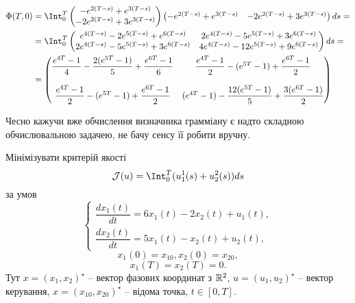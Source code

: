 \begin{solution}
    \begin{align*} 
        \Phi(T, 0) &= \Int_0^T \begin{pmatrix} -e^{2(T - s)} + e^{3(T - s)} \\ -2e^{2(T - s)} + 3e^{3(T - s)} \end{pmatrix} \begin{pmatrix} -e^{2(T - s)} + e^{3(T - s)} & -2e^{2(T - s)} + 3e^{3(T - s)} \end{pmatrix} ds = \\
        &= \Int_0^T \begin{pmatrix} e^{4(T - s)} - 2 e^{5(T - s)} + e^{6(T - s)} & 2 e^{4(T - s)} - 5 e^{5(T - s)} + 3 e^{6(T - s)} \\ 2e^{4(T - s)} - 5 e^{5(T - s)} + 3 e^{6(T - s)} & 4 e^{4(T - s)} - 12 e^{5(T - s)} + 9  e^{6(T - s)} \end{pmatrix} ds = \\
        &= \begin{pmatrix} \dfrac{e^{4T} - 1}{4} - \dfrac{2(e^{5T} - 1)}{5} + \dfrac{e^{6T} - 1}{6} & \dfrac{e^{4T} - 1}{2} - (e^{5T} - 1) + \dfrac{e^{6T} - 1}{2} \\ \\ \dfrac{e^{4T} - 1}{2} - (e^{5T} - 1) + \dfrac{e^{6T} - 1}{2} & (e^{4T} - 1) - \dfrac{12(e^{5T} - 1)}{5} + \dfrac{3(e^{6T} - 1)}{2} \end{pmatrix}
    \end{align*}
    
    Чесно кажучи вже обчислення визначника грамміану є надто складною обчислювальною задачею, не бачу сенсу її робити вручну.
\end{solution}

\begin{problem}
    Мінімізувати критерій якості 
    \[ \mathcal{J}(u) = \Int_0^T (u_1^1(s) + u_2^2(s)) ds \]
    за умов \[ \left\{ \begin{aligned} \dfrac{dx_1(t)}{dt} = 6x_1(t) - 2x_2(t) + u_1(t), \\ \dfrac{dx_2(t)}{dt} = 5x_1(t) - x_2(t) + u_2(t), \end{aligned} \right. \]
    \[ x_1(0) = x_{10}, x_2(0) = x_{20}, \] 
    \[ x_1(T) = x_2(T) = 0. \]
    Тут $x = (x_1, x_2)^\star$ -- вектор фазових координат з $\mathbb{R}^2$, $u=(u_1,u_2)^\star$ -- вектор керування, $x = (x_{10}, x_{20})^\star$ -- відома точка, $t \in [0, T]$.
\end{problem}

